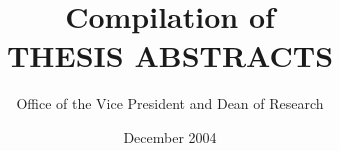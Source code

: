 \newcommand{\graddate}{December 2004}

\title{Compilation of\\ THESIS ABSTRACTS}
\author{Office of the Vice President and Dean of Research}

%
%
\date{\graddate}              %



